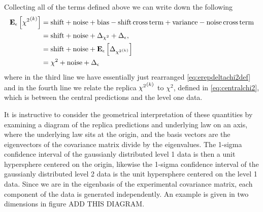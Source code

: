 Collecting all of the terms defined above we can write down the following
\begin{equation}
    \label{eq:chi2decomp}
    \begin{split}
        \mathbf{E}_{\epsilon}\left[ {\chi^2}^{(k)} \right] &= {\rm shift} + {\rm noise} + {\rm bias} - {\rm shift \, cross \, term} + {\rm variance} - {\rm noise \, cross \, term} \\
        &=  {\rm shift} + {\rm noise} + \Delta_{\chi^2} + \Delta_{\epsilon},\\
        &= {\rm shift} + {\rm noise} + \mathbf{E}_{\epsilon}\left[ \Delta_{{\chi^2}^{(k)}} \right] \\
        &= \chi^2 + {\rm noise} + \Delta_{\epsilon}
    \end{split}
\end{equation}
where in the third line we have essentially just rearranged
\eqref{eq:erepdeltachi2def} and in the fourth line we relate the replica
${\chi^2}^{(k)}$ to $\chi^2$, defined in \eqref{eq:centralchi2}, which is between the
central predictions and the level one data.

It is instructive to
consider the geometrical interpretation of these quantities by examining a
diagram of the replica predictions and underlying law on an axis, where
the underlying law sits at the origin, and the basis vectors are the eigenvectors
of the covariance matrix divide by the eigenvalues. The 1-sigma confidence interval
of the gaussianly distributed level 1 data is then a unit hypersphere centered
on the origin, likewise the 1-sigma confidence interval of the gaussianly
distributed level 2 data is the unit hypersphere centered on the level 1 data.
Since we are in the eigenbasis of the experimental covariance matrix, each
component of the data is generated independently. An example is given in
two dimensions in figure ADD THIS DIAGRAM.

